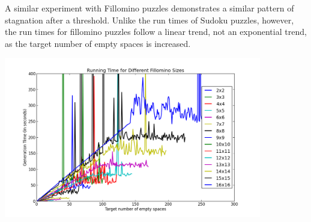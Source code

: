 A similar experiment with Fillomino puzzles demonstrates a similar pattern of stagnation after a threshold. Unlike the run times of Sudoku puzzles, however, the run times for fillomino puzzles follow a linear trend, not an exponential trend, as the target number of empty spaces is increased.

\centerline{\includegraphics[height = 7cm]{fillomino2.png}}





